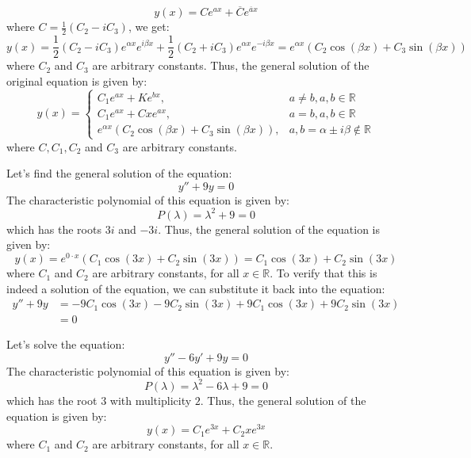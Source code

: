 \[
    y(x) = Ce^{ax} + \overline{C} e^{\overline{a}x}
\]
where $C = \frac{1}{2}(C_2 - i C_3)$, we get:
\[
    y(x) = \frac{1}{2} (C_2 - i C_3) e^{\alpha x} e^{i \beta x} + \frac{1}{2} (C_2 + i C_3) e^{\alpha x} e^{-i \beta x} = e^{\alpha x} \left(C_2 \cos (\beta x) + C_3 \sin (\beta x)\right)
\]
where $C_2$ and $C_3$ are arbitrary constants. Thus, the general solution of the original equation is given by:
\[
    y(x) = \begin{cases}
    C_1 e^{ax} + K e^{bx}, & a \neq b, a,b \in \mathbb{R} \\
    C_1 e^{ax} + C x e^{ax}, & a = b, a,b \in \mathbb{R} \\
    e^{\alpha x} \left(C_2 \cos (\beta x) + C_3 \sin (\beta x)\right), & a,b = \alpha \pm i \beta \notin \mathbb{R}
    \end{cases}
\]
where $C, C_1, C_2$ and $C_3$ are arbitrary constants.

\begin{eg}
    Let's find the general solution of the equation:
    \[
        y'' + 9y = 0
    \]
    The characteristic polynomial of this equation is given by:
    \[
        P(\lambda) = \lambda^2 + 9 = 0
    \]
    which has the roots $3i$ and $-3i$. Thus, the general solution of the equation is given by:
    \[
        y(x) = e^{0 \cdot x} \left(C_1 \cos (3x) + C_2 \sin (3x)\right) = C_1 \cos (3x) + C_2 \sin (3x)
    \]
    where $C_1$ and $C_2$ are arbitrary constants, for all $x \in \mathbb{R}$. To verify that this is indeed a solution of the equation, we can substitute it back into the equation:
    \begin{align*}
        y'' + 9y & = -9C_1 \cos (3x) - 9C_2 \sin (3x) + 9C_1 \cos (3x) + 9C_2 \sin (3x) \\
        & = 0
    \end{align*}
\end{eg}

\begin{eg}
    Let's solve the equation:
    \[
        y'' - 6y' + 9y = 0
    \]
    The characteristic polynomial of this equation is given by:
    \[
        P(\lambda) = \lambda^2 - 6\lambda + 9 = 0
    \]
    which has the root $3$ with multiplicity $2$. Thus, the general solution of the equation is given by:
    \[
        y(x) = C_1 e^{3x} + C_2 x e^{3x}
    \]
    where $C_1$ and $C_2$ are arbitrary constants, for all $x \in \mathbb{R}$.
\end{eg}

